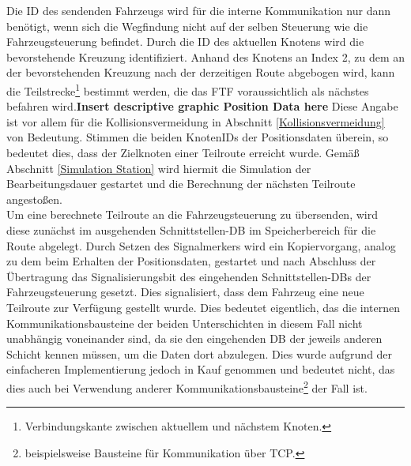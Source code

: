 		Die ID des sendenden Fahrzeugs wird für die interne Kommunikation nur dann benötigt, wenn sich die Wegfindung nicht auf der selben Steuerung wie die Fahrzeugsteuerung befindet. Durch die ID des aktuellen Knotens wird die bevorstehende Kreuzung identifiziert. Anhand des Knotens an Index 2, zu dem an der bevorstehenden Kreuzung nach der derzeitigen Route abgebogen wird, kann die Teilstrecke\footnote{Verbindungskante zwischen aktuellem und nächstem Knoten.} bestimmt werden, die das \ac{FTF} voraussichtlich als nächstes befahren wird.\textbf{Insert descriptive graphic Position Data here} Diese Angabe ist vor allem für die Kollisionsvermeidung in Abschnitt \ref{Kollisionsvermeidung} von Bedeutung. Stimmen die beiden KnotenIDs der Positionsdaten überein, so bedeutet dies, dass der Zielknoten einer Teilroute erreicht wurde. Gemäß Abschnitt \ref{Simulation Station} wird hiermit die Simulation der Bearbeitungsdauer gestartet und die Berechnung der nächsten Teilroute angestoßen.
		\\
		Um eine berechnete Teilroute an die Fahrzeugsteuerung zu übersenden, wird diese zunächst im ausgehenden Schnittstellen-\ac{DB} im Speicherbereich für die Route abgelegt. Durch Setzen des Signalmerkers wird ein Kopiervorgang, analog zu dem beim Erhalten der Positionsdaten, gestartet und nach Abschluss der Übertragung das Signalisierungsbit des eingehenden Schnittstellen-{DB}s der Fahrzeugsteuerung gesetzt. Dies signalisiert, dass dem Fahrzeug eine neue Teilroute zur Verfügung gestellt wurde. Dies bedeutet eigentlich, das die internen Kommunikationsbausteine der beiden Unterschichten in diesem Fall nicht unabhängig voneinander sind, da sie den eingehenden \ac{DB} der jeweils anderen Schicht kennen müssen, um die Daten dort abzulegen. Dies wurde aufgrund der einfacheren Implementierung jedoch in Kauf genommen und bedeutet nicht, das dies auch bei Verwendung anderer Kommunikationsbausteine\footnote{beispielsweise Bausteine für Kommunikation über \ac{TCP}.} der Fall ist.
				
